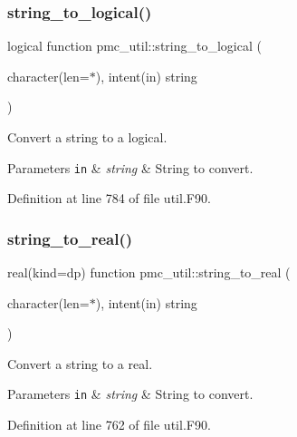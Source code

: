\subsubsection{\texorpdfstring{string\+\_\+to\+\_\+logical()}{string\_to\_logical()}}
{\footnotesize\ttfamily logical function pmc\+\_\+util\+::string\+\_\+to\+\_\+logical (\begin{DoxyParamCaption}\item[{character(len=$\ast$), intent(in)}]{string }\end{DoxyParamCaption})}



Convert a string to a logical. 


\begin{DoxyParams}[1]{Parameters}
\mbox{\tt in}  & {\em string} & String to convert. \\
\hline
\end{DoxyParams}


Definition at line 784 of file util.\+F90.

\mbox{\label{namespacepmc__util_a1d18d4c7adea4978d104517da57995ef}} 
\subsubsection{\texorpdfstring{string\+\_\+to\+\_\+real()}{string\_to\_real()}}
{\footnotesize\ttfamily real(kind=dp) function pmc\+\_\+util\+::string\+\_\+to\+\_\+real (\begin{DoxyParamCaption}\item[{character(len=$\ast$), intent(in)}]{string }\end{DoxyParamCaption})}



Convert a string to a real. 


\begin{DoxyParams}[1]{Parameters}
\mbox{\tt in}  & {\em string} & String to convert. \\
\hline
\end{DoxyParams}


Definition at line 762 of file util.\+F90.

\mbox{\label{namespacepmc__util_aa8c823006029e4a59872cb3f1e14bc70}} 
